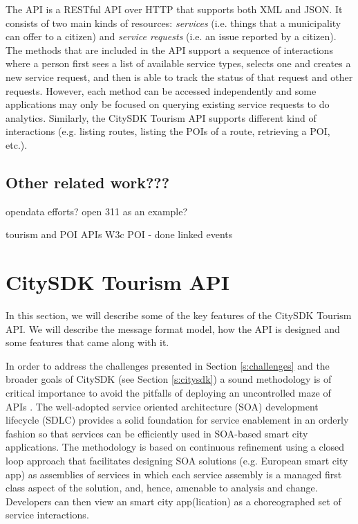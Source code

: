 \documentclass[times]{ettauth}
\begin{document}
The API is a RESTful API over HTTP that supports both XML and JSON.
It consists of two main kinds of resources: \emph{services} (i.e. things that a municipality can offer to a citizen) and \emph{service requests} (i.e. an issue reported by a citizen).
The methods that are included in the API support a sequence of interactions where a person first sees a list of available service types, selects one and creates a new service request, and then is able to track the status of that request and other requests.
However, each method can be accessed independently and some applications may only be focused on querying existing service requests to do analytics.
Similarly, the CitySDK Tourism API supports different kind of interactions (e.g. listing routes, listing the POIs of a route, retrieving a POI, etc.).

\subsection{Other related work???}


opendata efforts?
 open 311 as an example?

tourism and POI APIs
 W3c POI - done
 linked events



\section{CitySDK Tourism API}
\label{s:tourim-api}
In this section, we will describe some of the key features of the CitySDK Tourism API. We will describe the message format model, how the API is designed and some features that came along with it.

In order to address the challenges presented in Section \ref{s:challenges} and the broader goals of CitySDK (see Section \ref{s:citysdk}) a sound methodology is of critical importance to avoid the pitfalls of deploying an uncontrolled maze of APIs \cite{papazoglou2007,monsieur2012}. The well-adopted service oriented architecture (SOA) development lifecycle (SDLC) \cite{papazoglou2007} provides a solid foundation for service enablement in an orderly fashion so that services can be efficiently used in SOA-based smart city applications. The methodology is based on continuous refinement using a closed loop approach that facilitates designing SOA solutions (e.g. European smart city app) as assemblies of services in which each service assembly is a managed first class aspect of the solution, and, hence, amenable to analysis and change. Developers can then view an smart city app(lication) as a choreographed set of service interactions.
\end{document}
